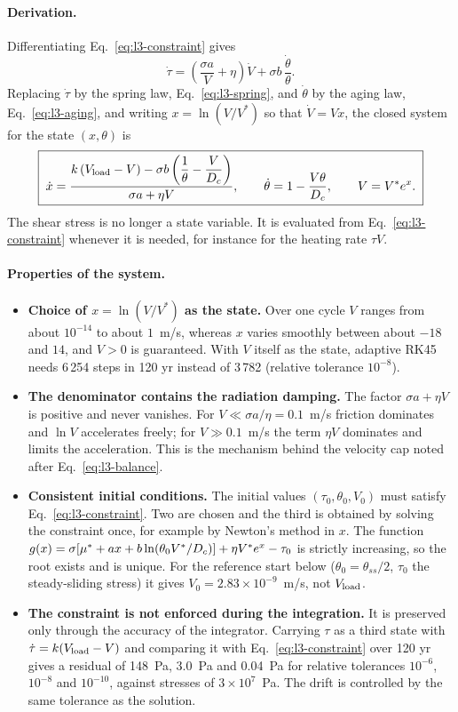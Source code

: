\paragraph{Derivation.} Differentiating Eq.~\eqref{eq:l3-constraint} gives
\begin{equation}
\dot\tau=\left(\frac{\sigma a}{V}+\eta\right)\dot V+\sigma b\,\frac{\dot\theta}{\theta}.
\end{equation}
Replacing $\dot\tau$ by the spring law, Eq.~\eqref{eq:l3-spring}, and $\dot\theta$ by the aging law, Eq.~\eqref{eq:l3-aging}, and writing $x=\ln(V/V^*)$ so that $\dot V=V\dot x$, the closed system for the state $(x,\theta)$ is
\begin{equation}
\boxed{\;
\dot x=\frac{k\,(V_{\mathrm{load}}-V)-\sigma b\left(\dfrac{1}{\theta}-\dfrac{V}{D_c}\right)}{\sigma a+\eta V},\qquad
\dot\theta=1-\frac{V\theta}{D_c},\qquad V=V^*e^{x}.\;}
\label{eq:l3-ode}
\end{equation}
The shear stress is no longer a state variable. It is evaluated from Eq.~\eqref{eq:l3-constraint} whenever it is needed, for instance for the heating rate $\tau V$.

\paragraph{Properties of the system.}
\begin{itemize}[itemsep=1pt,topsep=2pt]
\item \textbf{Choice of $x=\ln(V/V^*)$ as the state.} Over one cycle $V$ ranges from about $10^{-14}$ to about $1$~m/s, whereas $x$ varies smoothly between about $-18$ and $14$, and $V>0$ is guaranteed. With $V$ itself as the state, adaptive RK45 needs 6\,254 steps in 120 yr instead of 3\,782 (relative tolerance $10^{-8}$).
\item \textbf{The denominator contains the radiation damping.} The factor $\sigma a+\eta V$ is positive and never vanishes. For $V\ll\sigma a/\eta=0.1$~m/s friction dominates and $\ln V$ accelerates freely; for $V\gg0.1$~m/s the term $\eta V$ dominates and limits the acceleration. This is the mechanism behind the velocity cap noted after Eq.~\eqref{eq:l3-balance}.
\item \textbf{Consistent initial conditions.} The initial values $(\tau_0,\theta_0,V_0)$ must satisfy Eq.~\eqref{eq:l3-constraint}. Two are chosen and the third is obtained by solving the constraint once, for example by Newton's method in $x$. The function $g(x)=\sigma[\mu^*+ax+b\ln(\theta_0V^*/D_c)]+\eta V^*e^{x}-\tau_0$ is strictly increasing, so the root exists and is unique. For the reference start below ($\theta_0=\theta_{ss}/2$, $\tau_0$ the steady-sliding stress) it gives $V_0=2.83\times10^{-9}$~m/s, not $V_{\mathrm{load}}$.
\item \textbf{The constraint is not enforced during the integration.} It is preserved only through the accuracy of the integrator. Carrying $\tau$ as a third state with $\dot\tau=k(V_{\mathrm{load}}-V)$ and comparing it with Eq.~\eqref{eq:l3-constraint} over 120 yr gives a residual of 148~Pa, 3.0~Pa and 0.04~Pa for relative tolerances $10^{-6}$, $10^{-8}$ and $10^{-10}$, against stresses of $3\times10^{7}$~Pa. The drift is controlled by the same tolerance as the solution.
\end{itemize}

